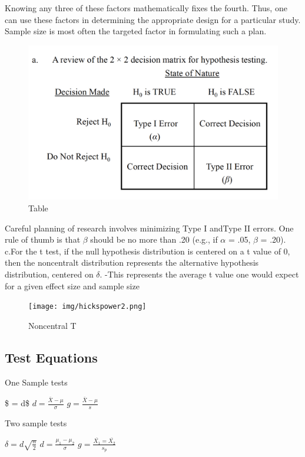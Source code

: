 \documentclass[]{book}
\theoremstyle{definition}
\theoremstyle{definition}
\theoremstyle{definition}
\theoremstyle{remark}
\begin{document}
Knowing any three of these factors mathematically fixes the fourth.
Thus, one can use these factors in determining the appropriate design
for a particular study. Sample size is most often the targeted factor in
formulating such a plan.

\begin{figure}
\centering
\includegraphics{img/hickspower1.png}
\caption{Table}
\end{figure}

Careful planning of research involves minimizing Type I andType II
errors. One rule of thumb is that \(\beta\) should be no more than .20
(e.g., if \(\alpha\) = .05, \(\beta\) = .20). c.For the t test, if the
null hypothesis distribution is centered on a t value of 0, then the
noncentralt distribution represents the alternative hypothesis
distribution, centered on \(\delta\). -This represents the average t
value one would expect for a given effect size and sample size

\begin{figure}
\centering
\texttt{[image: img/hickspower2.png]}
\caption{Noncentral T}
\end{figure}

\subsection{Test Equations}\label{test-equations}

One Sample tests

\$ \delta = d\$ \(d = \frac{\bar{X}-\mu}{\sigma}\)
\(g = \frac{\bar{X}-\mu}{s}\)

Two sample tests

\(\delta = d\sqrt{\frac{n}{2}}\) \(d = \frac{\mu_1-\mu_2}{\sigma}\)
\(g = \frac{\bar{X_1}=\bar{X_2}}{s_p}\)
\end{document}
